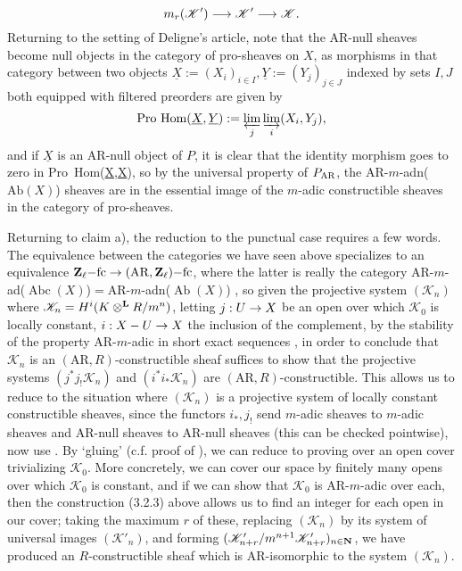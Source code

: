 \documentclass[deligne.tex]{subfiles}
\begin{document}
\begin{equation*}
	m_r(\mathscr K')\longrightarrow\mathscr K'\longrightarrow\mathscr K.
\end{equation*}
Returning to the setting of Deligne's article, note that the AR-null
sheaves become null objects in the category of pro-sheaves on $X$, as 
morphisms in that category between two objects
$\underline X:=(X_i)_{i\in I},\underline Y:=(Y_j)_{j\in J}$ indexed by sets
$I,J$ both equipped  with filtered preorders are given by
\begin{equation*}
	\text{Pro Hom}(\underline X,\underline Y)
	:=\varprojlim_j\varinjlim_i(X_i,Y_j),
\end{equation*}
and if $\underline X$ is an AR-null object of $P$, it is clear that
the identity morphism goes to zero in Pro~Hom(\underline X,\underline X),
so by the universal property of $P_{\mathrm{AR}}$, the
AR-$m$-adn($\mathrm{Ab}(X)$) sheaves are in the essential image
of the $m$-adic constructible sheaves in the category of pro-sheaves.

Returning to claim a), the reduction to the punctual case requires a few 
words. The equivalence between the categories we have seen above 
specializes to an equivalence
$\mathbf{Z}_\ell\mathrm{-fc}\rightarrow(\mathrm{AR},\mathbf{Z}_\ell)\mathrm{-fc}$,
where the latter is really the category
AR-$m$-ad($\operatorname{Abc}(X)$)$=$AR-$m$-adn($\operatorname{Ab}(X)$)
\cite[VI, 1.5.5]{SGA5}, so given the projective system $(\mathscr K_n)$
where $\mathscr K_n=H^i(K\otimes^{\mathbf{L}} R/m^n)$, letting $j:U\rightarrow X$ be an open
over which $\mathscr K_0$ is locally constant, $i:X-U\rightarrow X$ the inclusion
of the complement, by the stability of the property AR-$m$-adic in short
exact sequences \cite[V, 3.2.4]{SGA5}, in order to conclude that
$\mathscr K_n$ is an $(\mathrm{AR},R)$-constructible sheaf suffices to show 
that the projective systems $(j^*j_!\mathscr K_n)$ and
$(i^*i_*\mathscr K_n)$ are $(\mathrm{AR},R)$-constructible. This allows us
to reduce to the situation where $(\mathscr K_n)$ is a projective system
of locally constant constructible sheaves, since the functors $i_*,j_!$
send $m$-adic sheaves to $m$-adic sheaves and AR-null sheaves to AR-null
sheaves (this can be checked pointwise), now use \cite[V, 2.4.5]{SGA5}.
By `gluing' (c.f. proof of \cite[VI, 1.5.5]{SGA5}), we can reduce to
proving over an open cover trivializing $\mathscr K_0$.
More concretely, we can cover our space by finitely many opens over which
$\mathscr K_0$ is constant, and if we can show that $\mathscr K_0$ is
AR-$m$-adic over each, then the construction (3.2.3) above allows us to
find an integer for each open in our cover; taking the maximum $r$ of
these, replacing $(\mathscr K_n)$ by its system of universal images
$(\mathscr K'_n)$, and forming
$(\mathscr K'_{n+r}/m^{n+1}\mathscr K'_{n+r})_{n\in\mathbf{N}}$, we have
produced an $R$-constructible sheaf which is AR-isomorphic to the system
$(\mathscr K_n)$.
\end{document}
